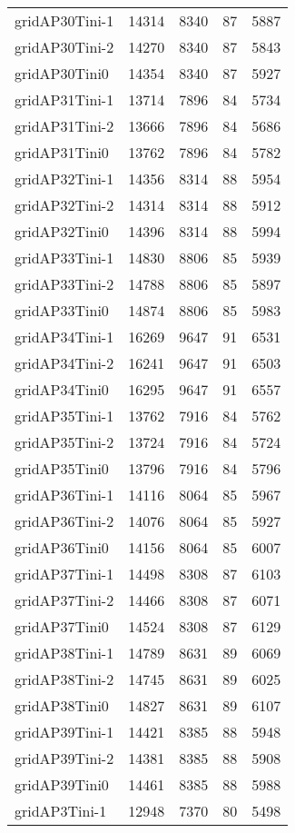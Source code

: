 \begin{longtable}{lrrrr}
gridAP30Tini-1 & 14314 & 8340 & 87 & 5887 \\
gridAP30Tini-2 & 14270 & 8340 & 87 & 5843 \\
gridAP30Tini0 & 14354 & 8340 & 87 & 5927 \\
gridAP31Tini-1 & 13714 & 7896 & 84 & 5734 \\
gridAP31Tini-2 & 13666 & 7896 & 84 & 5686 \\
gridAP31Tini0 & 13762 & 7896 & 84 & 5782 \\
gridAP32Tini-1 & 14356 & 8314 & 88 & 5954 \\
gridAP32Tini-2 & 14314 & 8314 & 88 & 5912 \\
gridAP32Tini0 & 14396 & 8314 & 88 & 5994 \\
gridAP33Tini-1 & 14830 & 8806 & 85 & 5939 \\
gridAP33Tini-2 & 14788 & 8806 & 85 & 5897 \\
gridAP33Tini0 & 14874 & 8806 & 85 & 5983 \\
gridAP34Tini-1 & 16269 & 9647 & 91 & 6531 \\
gridAP34Tini-2 & 16241 & 9647 & 91 & 6503 \\
gridAP34Tini0 & 16295 & 9647 & 91 & 6557 \\
gridAP35Tini-1 & 13762 & 7916 & 84 & 5762 \\
gridAP35Tini-2 & 13724 & 7916 & 84 & 5724 \\
gridAP35Tini0 & 13796 & 7916 & 84 & 5796 \\
gridAP36Tini-1 & 14116 & 8064 & 85 & 5967 \\
gridAP36Tini-2 & 14076 & 8064 & 85 & 5927 \\
gridAP36Tini0 & 14156 & 8064 & 85 & 6007 \\
gridAP37Tini-1 & 14498 & 8308 & 87 & 6103 \\
gridAP37Tini-2 & 14466 & 8308 & 87 & 6071 \\
gridAP37Tini0 & 14524 & 8308 & 87 & 6129 \\
gridAP38Tini-1 & 14789 & 8631 & 89 & 6069 \\
gridAP38Tini-2 & 14745 & 8631 & 89 & 6025 \\
gridAP38Tini0 & 14827 & 8631 & 89 & 6107 \\
gridAP39Tini-1 & 14421 & 8385 & 88 & 5948 \\
gridAP39Tini-2 & 14381 & 8385 & 88 & 5908 \\
gridAP39Tini0 & 14461 & 8385 & 88 & 5988 \\
gridAP3Tini-1 & 12948 & 7370 & 80 & 5498 \\

\end{longtable}
